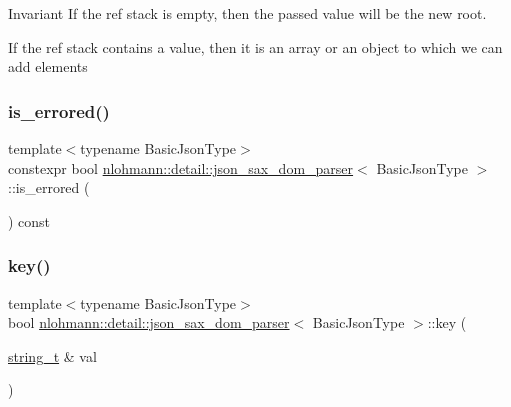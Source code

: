 \begin{DoxyInvariant}{Invariant}
If the ref stack is empty, then the passed value will be the new root. 

If the ref stack contains a value, then it is an array or an object to which we can add elements 
\end{DoxyInvariant}
\mbox{\label{classnlohmann_1_1detail_1_1json__sax__dom__parser_ad1b9f3681fadbbb2e0127f5c8a99c662}} 
\subsubsection{\texorpdfstring{is\_errored()}{is\_errored()}}
{\footnotesize\ttfamily template$<$typename Basic\+Json\+Type$>$ \\
constexpr bool \mbox{\hyperlink{classnlohmann_1_1detail_1_1json__sax__dom__parser}{nlohmann\+::detail\+::json\+\_\+sax\+\_\+dom\+\_\+parser}}$<$ Basic\+Json\+Type $>$\+::is\+\_\+errored (\begin{DoxyParamCaption}{ }\end{DoxyParamCaption}) const\hspace{0.3cm}{\ttfamily [inline]}}

\mbox{\label{classnlohmann_1_1detail_1_1json__sax__dom__parser_ad427febda4997cbd8345a2596af66649}} 
\subsubsection{\texorpdfstring{key()}{key()}}
{\footnotesize\ttfamily template$<$typename Basic\+Json\+Type$>$ \\
bool \mbox{\hyperlink{classnlohmann_1_1detail_1_1json__sax__dom__parser}{nlohmann\+::detail\+::json\+\_\+sax\+\_\+dom\+\_\+parser}}$<$ Basic\+Json\+Type $>$\+::key (\begin{DoxyParamCaption}\item[{\mbox{\hyperlink{classnlohmann_1_1detail_1_1json__sax__dom__parser_afd4d961ab2a6b01cbe6e840f7fb90cdc}{string\+\_\+t}} \&}]{val }\end{DoxyParamCaption})\hspace{0.3cm}{\ttfamily [inline]}}

